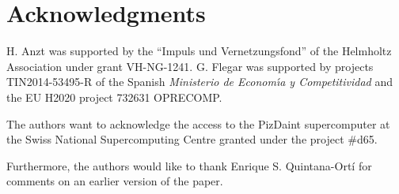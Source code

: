 \section*{Acknowledgments}
H. Anzt was supported by the ``Impuls und Vernetzungsfond'' of the Helmholtz 
Association under grant VH-NG-1241.
G. Flegar was supported by projects TIN2014-53495-R of the Spanish 
{\em Ministerio de Econom\'{\i}a y Competitividad}
and the EU H2020 project 732631 OPRECOMP.

The authors want to acknowledge the access to the PizDaint supercomputer at the 
Swiss National Supercomputing Centre granted under the project \#d65.

Furthermore, the authors would like to thank Enrique S. Quintana-Ort\'{i} for 
comments on an earlier version of the paper.
